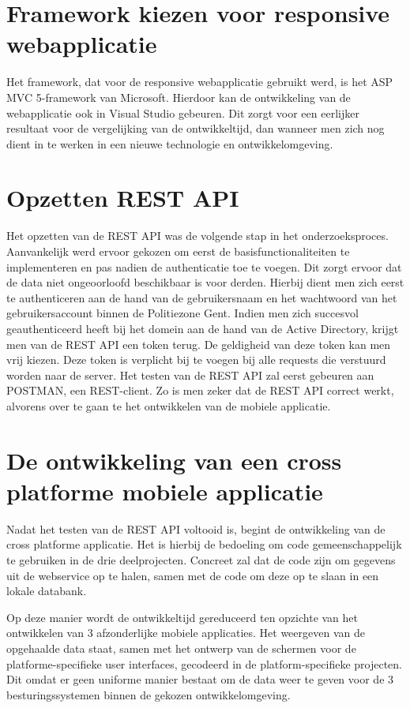 \section{Framework kiezen voor responsive webapplicatie}
Het framework, dat voor de responsive webapplicatie gebruikt werd, is het ASP MVC 5-framework van Microsoft.
Hierdoor kan de ontwikkeling van de webapplicatie ook in Visual Studio gebeuren. Dit zorgt voor een eerlijker resultaat voor de vergelijking van de ontwikkeltijd,
dan wanneer men zich nog dient in te werken in een nieuwe technologie en ontwikkelomgeving.

\section{Opzetten REST API}
Het opzetten van de REST API was de volgende stap in het onderzoeksproces. Aanvankelijk werd ervoor gekozen om eerst de basisfunctionaliteiten te implementeren en
pas nadien de authenticatie toe te voegen. Dit zorgt ervoor dat de data niet ongeoorloofd beschikbaar is voor derden.
Hierbij dient men zich eerst te authenticeren aan de hand van de gebruikersnaam en het wachtwoord van het gebruikersaccount binnen de Politiezone Gent.
Indien men zich succesvol geauthenticeerd heeft bij het domein aan de hand van de Active Directory, krijgt men van de REST API een token terug. De geldigheid van deze token kan men vrij kiezen.
Deze token is verplicht bij te voegen bij alle requests die verstuurd worden naar de server.
Het testen van de REST API zal eerst gebeuren aan POSTMAN, een REST-client. Zo is men zeker dat de REST API correct werkt, alvorens over te gaan te het ontwikkelen van de mobiele applicatie.

\section{De ontwikkeling van een cross platforme mobiele applicatie}
Nadat het testen van de REST API voltooid is, begint de ontwikkeling van de cross platforme applicatie.
Het is hierbij de bedoeling om code gemeenschappelijk te gebruiken in de drie deelprojecten. Concreet zal dat de code zijn om gegevens
uit de webservice op te halen, samen met de code om deze op te slaan in een lokale databank.

 Op deze manier wordt de ontwikkeltijd gereduceerd ten opzichte van het ontwikkelen van 3 afzonderlijke mobiele applicaties.
Het weergeven van de opgehaalde data staat, samen met het ontwerp van de schermen voor de platforme-specifieke user interfaces,
 gecodeerd in de platform-specifieke projecten. Dit omdat er geen uniforme manier bestaat om de data weer te geven voor de 3 besturingssystemen binnen
de gekozen ontwikkelomgeving.

